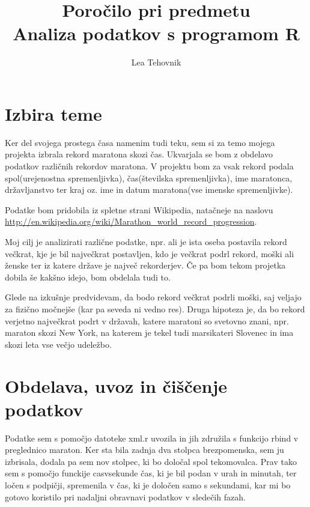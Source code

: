 \documentclass[11pt,a4paper]{article}
\begin{document}
\title{Poročilo pri predmetu \\
Analiza podatkov s programom R}
\author{Lea Tehovnik}
\maketitle

\section{Izbira teme}

Ker del svojega prostega časa namenim tudi teku, sem si za temo mojega projekta izbrala rekord maratona skozi čas.  Ukvarjala se bom z obdelavo podatkov različnih rekordov maratona. V projektu bom za vsak rekord podala spol(urejenostna spremenljivka), čas(številska spremenljivka), ime maratonca, državljanstvo ter kraj oz. ime in datum maratona(vse imenske spremenljivke). 

Podatke bom pridobila iz spletne strani Wikipedia, natačneje na naslovu \url{http://en.wikipedia.org/wiki/Marathon_world_record_progression}.

Moj cilj je analizirati različne podatke, npr. ali je ista oseba postavila rekord večkrat, kje je bil največkrat postavljen, kdo je večkrat podrl rekord, moški ali ženske ter iz katere države je največ rekorderjev. Če pa bom tekom projetka dobila še kakšno idejo, bom obdelala tudi to.

Glede na izkušnje predvidevam, da bodo rekord večkrat podrli moški, saj veljajo za fizično močnejše (kar pa seveda ni vedno res). Druga hipoteza je, da bo rekord verjetno največkrat podrt v državah, katere maratoni so svetovno znani, npr. maraton skozi New York, na katerem je tekel tudi marsikateri Slovenec in ima skozi leta vse večjo udeležbo.

\pagebreak
\section{Obdelava, uvoz in čiščenje podatkov}

Podatke sem s pomočjo datoteke xml.r uvozila in jih združila s funkcijo rbind v preglednico maraton. Ker sta bila zadnja dva stolpca brezpomenska, sem ju izbrisala, dodala pa sem nov stolpec, ki bo določal spol tekomovalca. Prav tako sem s pomočjo funckije casvsekunde čas, ki je bil podan v urah in minutah, ter ločen s podpičji, spremenila v čas, ki je določen samo s sekundami, kar mi bo gotovo koristilo pri nadaljni obravnavi podatkov v sledečih fazah.
\end{document}
